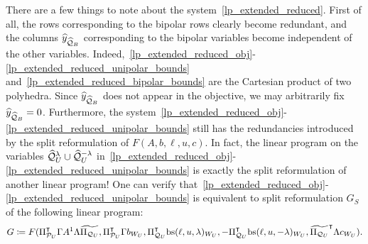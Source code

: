 \documentclass[pdflatex,sn-mathphys-num]{sn-jnl}%
\theoremstyle{thmstyleone}%
\theoremstyle{thmstylethree}%
\theoremstyle{thmstyletwo}%
\begin{document}
There are a few things to note about the system~\eqref{lp_extended_reduced}. First of all, the rows corresponding to the bipolar rows clearly become redundant, and the columns $\widehat{y}_{\widehat{\mathcal{Q}}_B}$ corresponding to the bipolar variables become independent of the other variables. Indeed,~\eqref{lp_extended_reduced_obj}-\eqref{lp_extended_reduced_unipolar_bounds} and~\eqref{lp_extended_reduced_bipolar_bounds} are the Cartesian product of two polyhedra.
Since $\widehat{y}_{\widehat{\mathcal{Q}}_B}$ does not appear in the objective, we may arbitrarily fix $\widehat{y}_{\widehat{\mathcal{Q}}_B} = 0$. Furthermore, the system~\eqref{lp_extended_reduced_obj}-\eqref{lp_extended_reduced_unipolar_bounds} still has the redundancies introduced by the split reformulation of $F(A,b,\ell,u,c)$. 
In fact, the linear program on the variables $\widehat{\mathcal{Q}}^\lambda_U \cup \widehat{\mathcal{Q}}^{-\lambda}_U$ in~\eqref{lp_extended_reduced_obj}-\eqref{lp_extended_reduced_unipolar_bounds} is exactly the split reformulation of another linear program!
One can verify that~\eqref{lp_extended_reduced_obj}-\eqref{lp_extended_reduced_unipolar_bounds} is equivalent to split reformulation $G_S$ of the following linear program:
\begin{equation*}
    G\coloneqq F(\transpose{\Pi_{\MP_U}} \Gamma A^1 \Lambda \widetilde{\Pi_{\MQ_U}},\transpose{\Pi_{\MP_U}} \Gamma b_{W_U},\transpose{\Pi_{\MQ_U}}\mathrm{bs}(\ell,u,\lambda)_{W_U}, - \transpose{\Pi_{\MQ_U}}\mathrm{bs}(\ell,u,-\lambda)_{W_U}, \transpose{\widetilde{\Pi_{\MQ_U}}} \Lambda c_{W_U}).
\end{equation*} 
\end{document}
